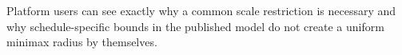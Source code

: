 Platform users can see exactly why a common scale restriction is necessary and why schedule-specific bounds in the published model do not create a uniform minimax radius by themselves.